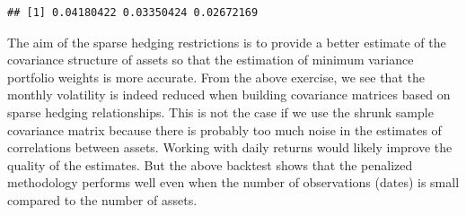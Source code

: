 \documentclass[]{krantz}
\makeatletter
\newenvironment{Shaded}{\begin{snugshade}}{\end{snugshade}}
\newcommand{\CommentTok}[1]{\textcolor[rgb]{0.37,0.37,0.37}{\textit{#1}}}
\newcommand{\ControlFlowTok}[1]{\textcolor[rgb]{0.27,0.27,0.27}{\textbf{#1}}}
\newcommand{\DecValTok}[1]{\textcolor[rgb]{0.06,0.06,0.06}{#1}}
\newcommand{\FloatTok}[1]{\textcolor[rgb]{0.06,0.06,0.06}{#1}}
\newcommand{\KeywordTok}[1]{\textcolor[rgb]{0.27,0.27,0.27}{\textbf{#1}}}
\newcommand{\NormalTok}[1]{#1}
\newcommand{\OperatorTok}[1]{\textcolor[rgb]{0.43,0.43,0.43}{\textbf{#1}}}
\newcommand{\StringTok}[1]{\textcolor[rgb]{0.5,0.5,0.5}{#1}}
\newenvironment{kframe}{%
\medskip{}
\setlength{\fboxsep}{.8em}
 \def\at@end@of@kframe{}%
 \ifinner\ifhmode%
  \def\at@end@of@kframe{\end{minipage}}%
  \begin{minipage}{\columnwidth}%
 \fi\fi%
 \def\FrameCommand##1{\hskip\@totalleftmargin \hskip-\fboxsep
 \colorbox{shadecolor}{##1}\hskip-\fboxsep
     \hskip-\linewidth \hskip-\@totalleftmargin \hskip\columnwidth}%
 \MakeFramed {\advance\hsize-\width
   \@totalleftmargin\z@ \linewidth\hsize
   \@setminipage}}%
 {\par\unskip\endMakeFramed%
 \at@end@of@kframe}
\renewenvironment{Shaded}{\begin{kframe}}{\end{kframe}}
\theoremstyle{definition}
\theoremstyle{definition}
\theoremstyle{definition}
\theoremstyle{remark}
\makeatother
\begin{document}
\begin{Shaded}
\end{Shaded}

\begin{verbatim}
## [1] 0.04180422 0.03350424 0.02672169
\end{verbatim}

\normalsize

The aim of the sparse hedging restrictions is to provide a better
estimate of the covariance structure of assets so that the estimation of
minimum variance portfolio weights is more accurate. From the above
exercise, we see that the monthly volatility is indeed reduced when
building covariance matrices based on sparse hedging relationships. This
is not the case if we use the shrunk sample covariance matrix because
there is probably too much noise in the estimates of correlations
between assets. Working with daily returns would likely improve the
quality of the estimates. But the above backtest shows that the
penalized methodology performs well even when the number of observations
(dates) is small compared to the number of assets.
\end{document}
